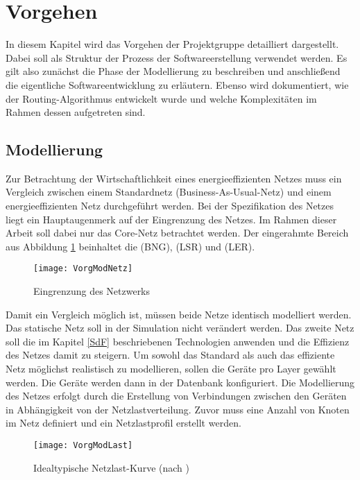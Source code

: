 \section{Vorgehen}
In diesem Kapitel wird das Vorgehen der Projektgruppe detailliert dargestellt. Dabei soll als Struktur der Prozess der Softwareerstellung verwendet werden. Es gilt also zunächst die Phase der Modellierung zu beschreiben und anschließend die eigentliche Softwareentwicklung zu erläutern. Ebenso wird dokumentiert, wie der Routing-Algorithmus entwickelt wurde und welche Komplexitäten im Rahmen dessen aufgetreten sind.

\subsection{Modellierung}
Zur Betrachtung der Wirtschaftlichkeit eines energieeffizienten Netzes muss ein Vergleich zwischen einem Standardnetz (Business-As-Usual-Netz) und einem energieeffizienten Netz durchgeführt werden. Bei der Spezifikation des Netzes liegt ein Hauptaugenmerk auf der Eingrenzung des Netzes. Im Rahmen dieser Arbeit soll dabei nur das Core-Netz betrachtet werden. Der eingerahmte Bereich aus Abbildung \ref{fig:VorgModNetz} beinhaltet die  (BNG),  (LSR) und  (LER).


\begin{figure}[htb]
	\centering
	\texttt{[image: VorgModNetz]}
	\caption{Eingrenzung des Netzwerks} 
	\label{fig:VorgModNetz}
\end{figure}


Damit ein Vergleich möglich ist, müssen beide Netze identisch modelliert werden. Das statische Netz soll in der Simulation nicht  verändert werden. Das zweite Netz soll die im Kapitel \ref{SdF} beschriebenen Technologien anwenden und die Effizienz des Netzes damit zu steigern. Um sowohl das Standard als auch das effiziente Netz möglichst realistisch zu modellieren, sollen die Geräte pro Layer gewählt werden. Die Geräte werden dann in der Datenbank konfiguriert.  Die Modellierung des Netzes erfolgt durch die Erstellung von Verbindungen zwischen den Geräten in Abhängigkeit von der Netzlastverteilung. Zuvor muss eine Anzahl von Knoten im Netz definiert und ein Netzlastprofil erstellt werden.

\begin{figure}[htb]
	\centering
	\texttt{[image: VorgModLast]}
	\caption{Idealtypische Netzlast-Kurve (nach \cite[3]{Chiaraviglio2009})} 
	\label{fig:VorgModLast}
\end{figure}

